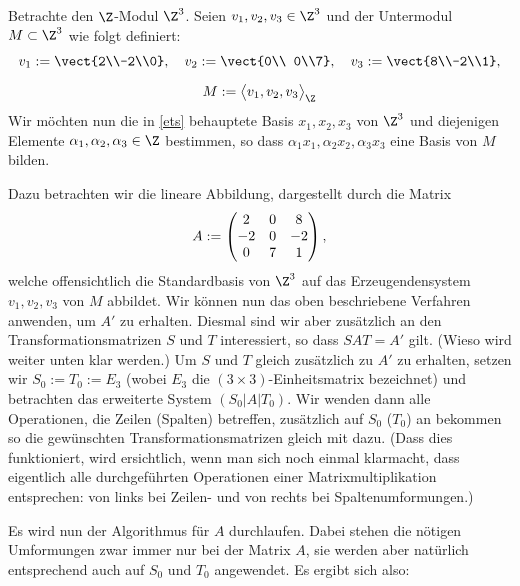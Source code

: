 \begin{thBeisp}\label{bsp:mat}
    Betrachte den $\Z$-Modul $\Z^3$. Seien $v_1,v_2,v_3 \in\Z^3$ und der
    Untermodul $M\subset\Z^3$ wie folgt definiert:
    \begin{gather*}
        v_1 := \vect{2\\-2\\0}, \quad 
        v_2 := \vect{0\\ 0\\7}, \quad
        v_3 := \vect{8\\-2\\1},
        \\[2mm]
        M := \Spann[\big]{v_1,v_2,v_3}_{\Z}
    \end{gather*}
    Wir möchten nun die in \cref{ets} behauptete Basis $x_1,x_2,x_3$ von
    $\Z^3$ und diejenigen Elemente $\alpha_1,\alpha_2,\alpha_3\in\Z$ bestimmen, so dass
    $\alpha_1 x_1,\alpha_2 x_2,\alpha_3 x_3$ eine Basis von $M$ bilden.
    
    Dazu betrachten wir die lineare Abbildung, dargestellt durch die Matrix
    \[ A := \begin{pmatrix}  2 & 0 &  8 \\
                    -2 & 0 & -2 \\
                     0 & 7 &  1   \end{pmatrix}  , \]
    welche offensichtlich die Standardbasis von $\Z^3$ auf das Erzeugendensystem
    $v_1,v_2,v_3$ von $M$ abbildet. Wir können nun das oben beschriebene
    Verfahren anwenden, um $A'$ zu erhalten. Diesmal sind wir aber zusätzlich an
    den Transformationsmatrizen $S$ und $T$ interessiert, so dass $S\!AT = A'$
    gilt. (Wieso wird weiter unten klar werden.) Um $S$ und $T$ gleich
    zusätzlich zu $A'$ zu erhalten, setzen wir $S_0:=T_0:=E_3$ (wobei $E_3$ die
    $(3\times3)$-Einheitsmatrix bezeichnet) und betrachten das erweiterte System
    $(S_0|A|T_0)$. Wir wenden dann alle Operationen, die Zeilen (Spalten)
    betreffen, zusätzlich auf $S_0$ ($T_0$) an bekommen so die gewünschten 
    Transformationsmatrizen gleich mit dazu.
    (Dass dies funktioniert, wird ersichtlich, wenn man sich noch einmal klarmacht,
    dass eigentlich alle durchgeführten Operationen einer Matrixmultiplikation
    entsprechen: von links bei Zeilen- und von rechts bei Spaltenumformungen.)
    
    Es wird nun der Algorithmus für $A$ durchlaufen. Dabei stehen die nötigen
    Umformungen zwar immer nur bei der Matrix $A$, sie werden aber natürlich
    entsprechend auch auf $S_0$ und $T_0$ angewendet. Es ergibt sich also:
    

\end{thBeisp}
